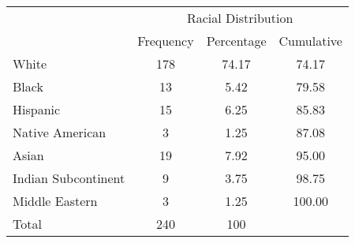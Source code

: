 {
\def\sym#1{\ifmmode^{#1}\else\(^{#1}\)\fi}
\begin{tabular}{l*{1}{ccc}}
\toprule
                   &\multicolumn{3}{c}{Racial Distribution}  \\
                    &      Frequency  &   Percentage &    Cumulative    \\
\midrule
White               &      178 &         74.17 &       74.17    \\
\midrule
Black               &      13 &           5.42 &      79.58   \\
\midrule
Hispanic            &      15   &        6.25  &      85.83  \\
\midrule
Native American     &      3 &            1.25 &      87.08   \\
\midrule
Asian               &      19 &           7.92 &      95.00   \\
\midrule
Indian Subcontinent &      9 &            3.75 &      98.75   \\
\midrule
Middle Eastern      &      3 &            1.25 &      100.00   \\
\midrule
Total                &    240   &       100 &        \\
\bottomrule
\end{tabular}
}